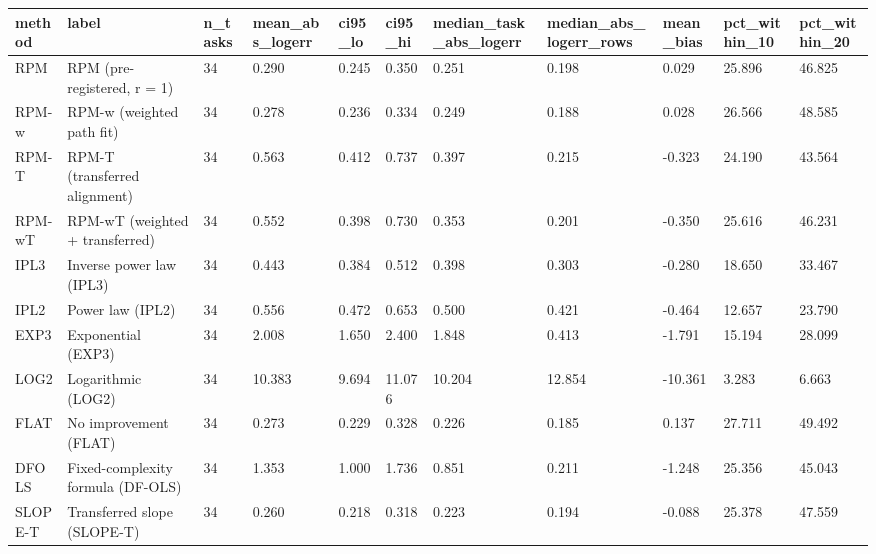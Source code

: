 \begin{tabular}{lllllllllll}
\hline
method & label & n\_tasks & mean\_abs\_logerr & ci95\_lo & ci95\_hi & median\_task\_abs\_logerr & median\_abs\_logerr\_rows & mean\_bias & pct\_within\_10 & pct\_within\_20 \\
\hline
RPM & RPM (pre-registered, r = 1) & 34 & 0.290 & 0.245 & 0.350 & 0.251 & 0.198 & 0.029 & 25.896 & 46.825 \\
RPM-w & RPM-w (weighted path fit) & 34 & 0.278 & 0.236 & 0.334 & 0.249 & 0.188 & 0.028 & 26.566 & 48.585 \\
RPM-T & RPM-T (transferred alignment) & 34 & 0.563 & 0.412 & 0.737 & 0.397 & 0.215 & -0.323 & 24.190 & 43.564 \\
RPM-wT & RPM-wT (weighted + transferred) & 34 & 0.552 & 0.398 & 0.730 & 0.353 & 0.201 & -0.350 & 25.616 & 46.231 \\
IPL3 & Inverse power law (IPL3) & 34 & 0.443 & 0.384 & 0.512 & 0.398 & 0.303 & -0.280 & 18.650 & 33.467 \\
IPL2 & Power law (IPL2) & 34 & 0.556 & 0.472 & 0.653 & 0.500 & 0.421 & -0.464 & 12.657 & 23.790 \\
EXP3 & Exponential (EXP3) & 34 & 2.008 & 1.650 & 2.400 & 1.848 & 0.413 & -1.791 & 15.194 & 28.099 \\
LOG2 & Logarithmic (LOG2) & 34 & 10.383 & 9.694 & 11.076 & 10.204 & 12.854 & -10.361 & 3.283 & 6.663 \\
FLAT & No improvement (FLAT) & 34 & 0.273 & 0.229 & 0.328 & 0.226 & 0.185 & 0.137 & 27.711 & 49.492 \\
DFOLS & Fixed-complexity formula (DF-OLS) & 34 & 1.353 & 1.000 & 1.736 & 0.851 & 0.211 & -1.248 & 25.356 & 45.043 \\
SLOPE-T & Transferred slope (SLOPE-T) & 34 & 0.260 & 0.218 & 0.318 & 0.223 & 0.194 & -0.088 & 25.378 & 47.559 \\
\hline
\end{tabular}
